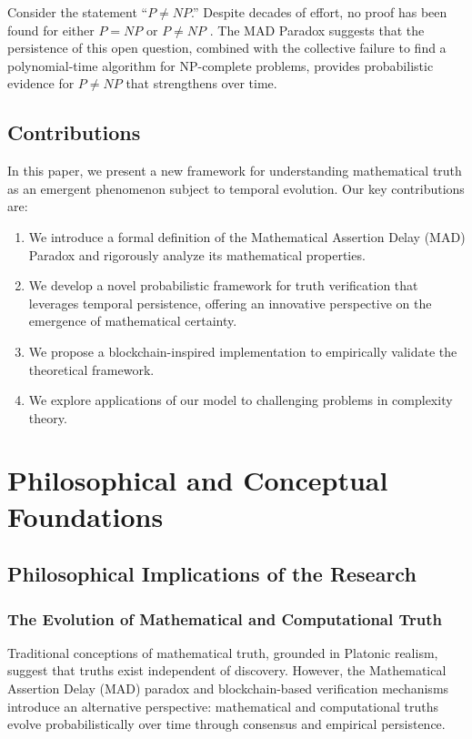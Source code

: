 \documentclass[11pt]{article}
\begin{document}
Consider the statement ``$P \neq NP$.'' Despite decades of effort, no proof has been found for either $P = NP$ or $P \neq NP$ \cite{Cook1971}. The MAD Paradox suggests that the persistence of this open question, combined with the collective failure to find a polynomial-time algorithm for NP-complete problems, provides probabilistic evidence for $P \neq NP$ that strengthens over time.

\subsection{Contributions}

In this paper, we present a new framework for understanding mathematical truth as an emergent phenomenon subject to temporal evolution. Our key contributions are:
\begin{enumerate}[label=(\arabic*)]
    \item We introduce a formal definition of the Mathematical Assertion Delay (MAD) Paradox and rigorously analyze its mathematical properties.
    \item We develop a novel probabilistic framework for truth verification that leverages temporal persistence, offering an innovative perspective on the emergence of mathematical certainty.
    \item We propose a blockchain-inspired implementation to empirically validate the theoretical framework.
    \item We explore applications of our model to challenging problems in complexity theory.
\end{enumerate}

\section{Philosophical and Conceptual Foundations}
\subsection{Philosophical Implications of the Research}

\subsubsection{The Evolution of Mathematical and Computational Truth}
Traditional conceptions of mathematical truth, grounded in Platonic realism, suggest that truths exist independent of discovery. However, the Mathematical Assertion Delay (MAD) paradox and blockchain-based verification mechanisms introduce an alternative perspective: mathematical and computational truths evolve probabilistically over time through consensus and empirical persistence.
\end{document}
